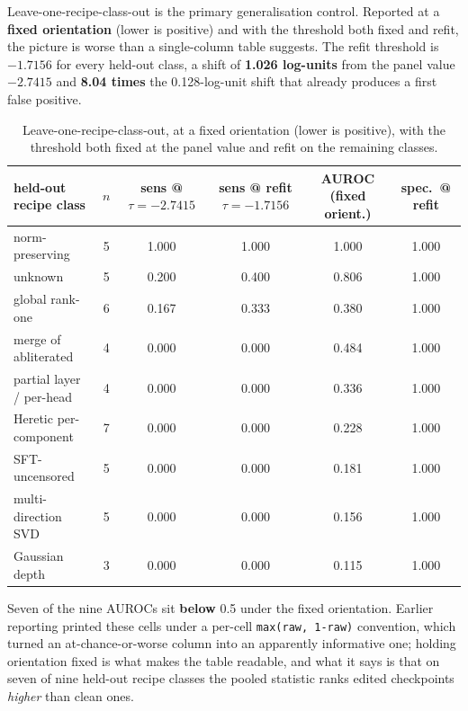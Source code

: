 \documentclass[11pt,letterpaper]{article}
\begin{document}
Leave-one-recipe-class-out is the primary generalisation control. Reported at a \textbf{fixed orientation} (lower is positive) and with the threshold both fixed and refit, the picture is worse than a single-column table suggests. The refit threshold is $-1.7156$ for every held-out class, a shift of \textbf{1.026 log-units} from the panel value $-2.7415$ and \textbf{8.04 times} the 0.128-log-unit shift that already produces a first false positive.

\begin{table}[!htbp]
\centering
\caption{Leave-one-recipe-class-out, at a fixed orientation (lower is positive), with the threshold both fixed at the panel value and refit on the remaining classes.}
\label{tab:lorco}
\footnotesize
\setlength{\tabcolsep}{4pt}
\begin{tabular}{lccccc}
\toprule
held-out recipe class & $n$ & sens @ $\tau=-2.7415$ & sens @ refit $\tau=-1.7156$ & AUROC (fixed orient.) & spec.\ @ refit \\
\midrule
norm-preserving & 5 & 1.000 & 1.000 & 1.000 & 1.000 \\
unknown & 5 & 0.200 & 0.400 & 0.806 & 1.000 \\
global rank-one & 6 & 0.167 & 0.333 & 0.380 & 1.000 \\
merge of abliterated & 4 & 0.000 & 0.000 & 0.484 & 1.000 \\
partial layer / per-head & 4 & 0.000 & 0.000 & 0.336 & 1.000 \\
Heretic per-component & 7 & 0.000 & 0.000 & 0.228 & 1.000 \\
SFT-uncensored & 5 & 0.000 & 0.000 & 0.181 & 1.000 \\
multi-direction SVD & 5 & 0.000 & 0.000 & 0.156 & 1.000 \\
Gaussian depth & 3 & 0.000 & 0.000 & 0.115 & 1.000 \\
\bottomrule
\end{tabular}
\end{table}

Seven of the nine AUROCs sit \textbf{below} 0.5 under the fixed orientation. Earlier reporting printed these cells under a per-cell \texttt{max(raw, 1-raw)} convention, which turned an at-chance-or-worse column into an apparently informative one; holding orientation fixed is what makes the table readable, and what it says is that on seven of nine held-out recipe classes the pooled statistic ranks edited checkpoints \emph{higher} than clean ones.
\end{document}
